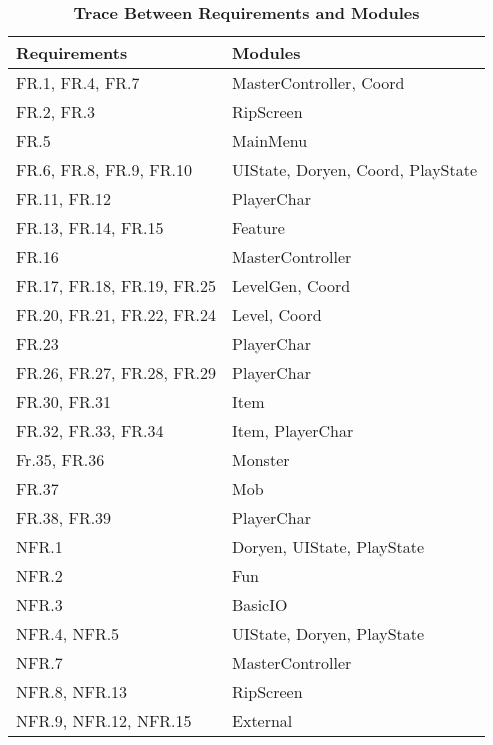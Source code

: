 \documentclass[12pt, titlepage]{article}
\begin{document}
    \begin{table}[H]
        \label{TblRT}
        \caption{\bf Trace Between Requirements and Modules}
        
        \def\arraystretch{1.2}
        \centering
        \bigskip
        \begin{tabular}{p{} p{}}

            \toprule
            \textbf{Requirements} & \textbf{Modules}\\
            \midrule

            FR.1, FR.4, FR.7 & MasterController, Coord\\
            FR.2, FR.3 & RipScreen\\
            FR.5 & MainMenu\\
            FR.6, FR.8, FR.9, FR.10 & UIState, Doryen, Coord, PlayState\\
            FR.11, FR.12 & PlayerChar\\
            FR.13, FR.14, FR.15 & Feature\\
            FR.16 & MasterController\\
            FR.17, FR.18, FR.19, FR.25 & LevelGen, Coord\\
            FR.20, FR.21, FR.22, FR.24 & Level, Coord\\
            FR.23 & PlayerChar\\
            FR.26, FR.27, FR.28, FR.29 & PlayerChar\\
            FR.30, FR.31 & Item\\
            FR.32, FR.33, FR.34 & Item, PlayerChar\\
            Fr.35, FR.36 & Monster\\
            FR.37 & Mob\\
            FR.38, FR.39 & PlayerChar\\
            \midrule
            NFR.1 & Doryen, UIState, PlayState\\
            NFR.2 & Fun\\
            NFR.3 & BasicIO\\
            NFR.4, NFR.5 & UIState, Doryen, PlayState\\
            NFR.7 & MasterController\\
            NFR.8, NFR.13 & RipScreen\\
            NFR.9, NFR.12, NFR.15 & External\\

            \bottomrule
        \end{tabular}
    \end{table}
\end{document}
